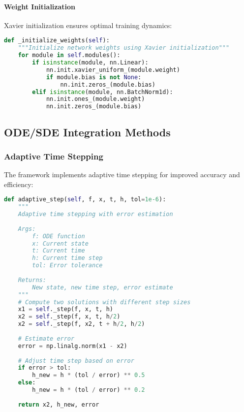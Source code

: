 \paragraph{Weight Initialization}
Xavier initialization ensures optimal training dynamics:

\begin{lstlisting}[language=Python, caption=Weight Initialization]
def _initialize_weights(self):
    """Initialize network weights using Xavier initialization"""
    for module in self.modules():
        if isinstance(module, nn.Linear):
            nn.init.xavier_uniform_(module.weight)
            if module.bias is not None:
                nn.init.zeros_(module.bias)
        elif isinstance(module, nn.BatchNorm1d):
            nn.init.ones_(module.weight)
            nn.init.zeros_(module.bias)
\end{lstlisting}

\subsection{ODE/SDE Integration Methods}

\subsubsection{Adaptive Time Stepping}

The framework implements adaptive time stepping for improved accuracy and efficiency:

\begin{lstlisting}[language=Python, caption=Adaptive Time Stepping]
def adaptive_step(self, f, x, t, h, tol=1e-6):
    """
    Adaptive time stepping with error estimation
    
    Args:
        f: ODE function
        x: Current state
        t: Current time
        h: Current time step
        tol: Error tolerance
    
    Returns:
        New state, new time step, error estimate
    """
    # Compute two solutions with different step sizes
    x1 = self._step(f, x, t, h)
    x2 = self._step(f, x, t, h/2)
    x2 = self._step(f, x2, t + h/2, h/2)
    
    # Estimate error
    error = np.linalg.norm(x1 - x2)
    
    # Adjust time step based on error
    if error > tol:
        h_new = h * (tol / error) ** 0.5
    else:
        h_new = h * (tol / error) ** 0.2
    
    return x2, h_new, error
\end{lstlisting}


